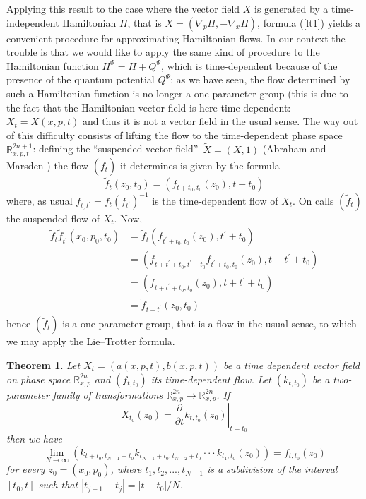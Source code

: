\documentclass[12pt]{article}%
\newtheorem{theorem}{Theorem}
\begin{document}
Applying this result to the case where the vector field $X$ is generated by a
time-independent Hamiltonian $H$, that is $X=(\nabla_{p}H,-\nabla_{x}H)$,
formula (\ref{lt1}) yields a convenient procedure for approximating
Hamiltonian flows. In our context the trouble is that we would like to apply
the same kind of procedure to the Hamiltonian function $H^{\Psi}=H+Q^{\Psi}$,
which is time-dependent because of the presence of the quantum potential
$Q^{\Psi}$; as we have seen, the flow determined by such a Hamiltonian
function is no longer a one-parameter group (this is due to the fact that the
Hamiltonian vector field is here time-dependent: $X_{t}=X(x,p,t)$ and thus it
is not a vector field in the usual sense. The way out of this difficulty
consists of lifting the flow to the time-dependent phase space $\mathbb{R}%
_{x,p,t}^{2n+1}$: defining the \textquotedblleft suspended vector
field\textquotedblright\ $\widetilde{X}=(X,1)$ (Abraham and Marsden \cite{AM})
the flow $(\widetilde{f}_{t})$ it determines is given by the formula
\begin{equation}
\widetilde{f}_{t}(z_{0},t_{0})=(f_{t+t_{0},t_{0}}(z_{0}),t+t_{0})
\label{extended}%
\end{equation}
where, as usual $f_{t,t^{\prime}}=f_{t}(f_{t^{\prime}})^{-1}$ is the
time-dependent flow of $X_{t}$. On calls $(\widetilde{f}_{t})$ the suspended
flow of $X_{t}$. Now,%
\begin{align*}
\widetilde{f}_{t}\widetilde{f}_{t^{\prime}}(x_{0},p_{0},t_{0})  &
=\widetilde{f}_{t}(f_{t^{\prime}+t_{0},t_{0}}(z_{0}),t^{\prime}+t_{0})\\
&  =(f_{t+t^{\prime}+t_{0},t^{\prime}+t_{0}}f_{t^{\prime}+t_{0},t_{0}}%
(z_{0}),t+t^{\prime}+t_{0})\\
&  =(f_{t+t^{\prime}+t_{0},t_{0}}(z_{0}),t+t^{\prime}+t_{0})\\
&  =\widetilde{f}_{t+t^{\prime}}(z_{0},t_{0})
\end{align*}
hence $(\widetilde{f}_{t})$ is a one-parameter group, that is a flow in the
usual sense, to which we may apply the Lie--Trotter formula.

\begin{theorem}
\label{Thm4}Let $X_{t}=(a(x,p,t),b(x,p,t))$ be a time dependent vector field
on phase space $\mathbb{R}_{x,p}^{2n}$ and $(f_{t,t_{0}})$ its time-dependent
flow. Let $(k_{t,t_{0}})$ be a two-parameter family of transformations
$\mathbb{R}_{x,p}^{2n}\longrightarrow\mathbb{R}_{x,p}^{2n}$. If
\begin{equation}
X_{t_{0}}(z_{0})=\left.  \frac{\partial}{\partial t}k_{t,t_{0}}(z_{0}%
)\right\vert _{t=t_{0}}%
\end{equation}
then we have
\begin{equation}
\lim_{N\rightarrow\infty}(k_{t+t_{0},t_{N-1}+t_{0}}k_{t_{N-1}+t_{0}%
,t_{N-2}+t_{0}}\cdot\cdot\cdot k_{t_{1},t_{0}}(z_{0}))=f_{t,t_{0}}(z_{0})
\label{lt2}%
\end{equation}
for every $z_{0}=(x_{0},p_{0})$, where $t_{1},t_{2},...,t_{N-1}$ is a
subdivision of the interval $[t_{0},t]$ such that $|t_{j+1}-t_{j}%
|=|t-t_{0}|/N$.
\end{theorem}
\end{document}
